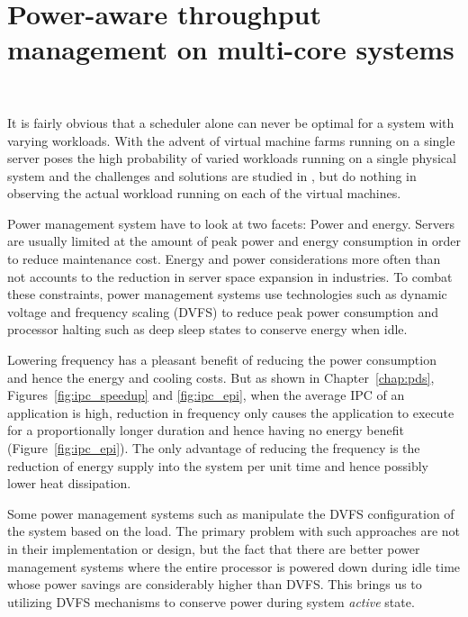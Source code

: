 \chapter{Power-aware throughput management on multi-core systems}~\label{chap:delta}

It is fairly obvious that a scheduler alone can never be optimal for a system
with varying workloads. With the advent of virtual machine farms running on a single
server poses the high probability of varied workloads running on a single physical system
and the challenges and solutions are studied in \cite{VirtualPower}, but do nothing 
in observing the actual workload running on each of the virtual machines. 

Power management system have to look at two facets: Power and energy. Servers are
usually limited at the amount of peak power and energy
consumption in order to reduce maintenance cost. Energy and power considerations more often than not accounts 
to the reduction in server space expansion in industries. To combat these constraints, power management systems
use technologies such as dynamic voltage and frequency scaling (DVFS) to reduce peak power
consumption and processor halting such as deep sleep states to conserve energy when idle.

Lowering frequency has a pleasant benefit of reducing the power consumption and hence
the energy and cooling costs. But as shown in Chapter~\ref{chap:pds}, Figures~\ref{fig:ipc_speedup} 
and \ref{fig:ipc_epi}, when the average IPC of an application is high, reduction in 
frequency only causes the application to execute for a proportionally longer duration and 
hence having no energy benefit (Figure~\ref{fig:ipc_epi}). The only advantage of reducing
the frequency is the reduction of energy supply into the system per unit time and hence
possibly lower heat dissipation. 

Some power management systems such as \cite{OnDemand} manipulate the DVFS configuration
of the system based on the load. The primary problem with such approaches are not in
their implementation or design, but the fact that there are better power management
systems where the entire processor is powered down during idle time whose power savings are considerably higher than DVFS. 
This brings us to utilizing DVFS mechanisms to conserve power during system \textit{active}
state. 

